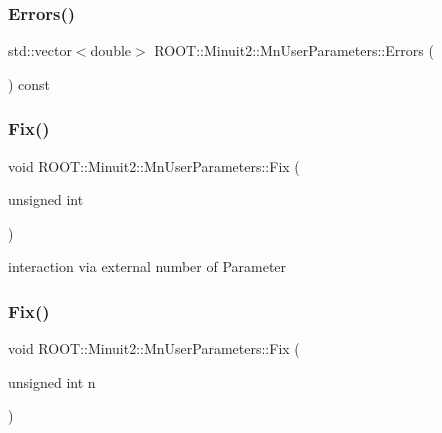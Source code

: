 \subsubsection{\texorpdfstring{Errors()}{Errors()}\hspace{0.1cm}{\footnotesize\ttfamily [3/3]}}
{\footnotesize\ttfamily std\+::vector$<$double$>$ R\+O\+O\+T\+::\+Minuit2\+::\+Mn\+User\+Parameters\+::\+Errors (\begin{DoxyParamCaption}{ }\end{DoxyParamCaption}) const}

\mbox{\label{classROOT_1_1Minuit2_1_1MnUserParameters_a53ce277313d9e1f8503e7ffbf8e7bce4}} 
\subsubsection{\texorpdfstring{Fix()}{Fix()}\hspace{0.1cm}{\footnotesize\ttfamily [1/6]}}
{\footnotesize\ttfamily void R\+O\+O\+T\+::\+Minuit2\+::\+Mn\+User\+Parameters\+::\+Fix (\begin{DoxyParamCaption}\item[{unsigned int}]{ }\end{DoxyParamCaption})}



interaction via external number of Parameter 

\mbox{\label{classROOT_1_1Minuit2_1_1MnUserParameters_a53ce277313d9e1f8503e7ffbf8e7bce4}} 
\subsubsection{\texorpdfstring{Fix()}{Fix()}\hspace{0.1cm}{\footnotesize\ttfamily [2/6]}}
{\footnotesize\ttfamily void R\+O\+O\+T\+::\+Minuit2\+::\+Mn\+User\+Parameters\+::\+Fix (\begin{DoxyParamCaption}\item[{unsigned int}]{n }\end{DoxyParamCaption})}



